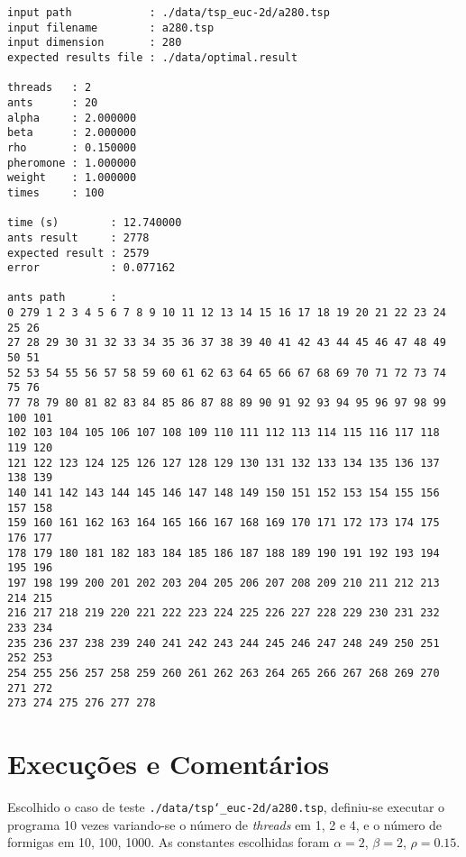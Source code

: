 \documentclass[a4paper, twoside, 12pt]{article}
\begin{document}
\begin{verbatim}input path            : ./data/tsp_euc-2d/a280.tsp
input filename        : a280.tsp
input dimension       : 280
expected results file : ./data/optimal.result

threads   : 2
ants      : 20
alpha     : 2.000000
beta      : 2.000000
rho       : 0.150000
pheromone : 1.000000
weight    : 1.000000
times     : 100

time (s)        : 12.740000
ants result     : 2778
expected result : 2579
error           : 0.077162

ants path       :
0 279 1 2 3 4 5 6 7 8 9 10 11 12 13 14 15 16 17 18 19 20 21 22 23 24 25 26
27 28 29 30 31 32 33 34 35 36 37 38 39 40 41 42 43 44 45 46 47 48 49 50 51
52 53 54 55 56 57 58 59 60 61 62 63 64 65 66 67 68 69 70 71 72 73 74 75 76
77 78 79 80 81 82 83 84 85 86 87 88 89 90 91 92 93 94 95 96 97 98 99 100 101
102 103 104 105 106 107 108 109 110 111 112 113 114 115 116 117 118 119 120
121 122 123 124 125 126 127 128 129 130 131 132 133 134 135 136 137 138 139
140 141 142 143 144 145 146 147 148 149 150 151 152 153 154 155 156 157 158
159 160 161 162 163 164 165 166 167 168 169 170 171 172 173 174 175 176 177
178 179 180 181 182 183 184 185 186 187 188 189 190 191 192 193 194 195 196
197 198 199 200 201 202 203 204 205 206 207 208 209 210 211 212 213 214 215
216 217 218 219 220 221 222 223 224 225 226 227 228 229 230 231 232 233 234
235 236 237 238 239 240 241 242 243 244 245 246 247 248 249 250 251 252 253
254 255 256 257 258 259 260 261 262 263 264 265 266 267 268 269 270 271 272
273 274 275 276 277 278\end{verbatim}

\section{Execuções e Comentários \label{sec:execucoes}}

Escolhido o caso de teste \texttt{./data/tsp\char`_euc-2d/a280.tsp}, definiu-se executar o programa 10 vezes variando-se o número de \textit{threads} em 1, 2 e 4, e o número de formigas em 10, 100, 1000. As constantes escolhidas foram $\alpha = 2$, $\beta = 2$, $\rho = 0.15$.
\end{document}
